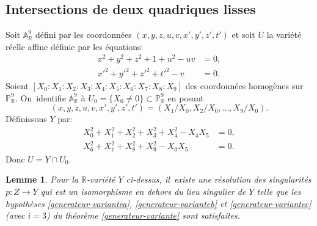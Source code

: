 \documentclass[JEP,XML,SOM,Unicode,francais,published]{cedram}
\newtheorem{lemma}[thm]{Lemme}
\theoremstyle{definition}
\newcommand{\R}{\mathbb R}
\newcommand{\A}{\mathbb A}
\renewcommand{\P}{\mathbb P}
\begin{document}
\subsection{Intersections de deux quadriques lisses}

Soit $\A^9_\R$ défini par les coordonnées $(x, y, z, u, v, x', y', z', t')$ et soit $U$ la variété réelle affine définie par les équations:
\begin{align}
x^2+y^2+z^2+1+u^2 - uv &= 0, \label{eq:U1} \\
x'^2+y'^2+z'^2+t'^2 - v &= 0. \label{eq:U2}
\end{align}
Soient $[X_0: X_1: X_2: X_3: X_4: X_5: X_6: X_7: X_8: X_9]$ des coordonnées homogènes sur $\P^9_\R$. On~identifie $\A^9_\R$ à $U_0=\{X_0\neq 0\}\subset \P^9_\R$ en posant
\[(x,y,z,u,v,x',y',z',t')=(X_1/X_0,X_2/X_0,\dots, X_9/X_0).\]
Définissons $Y$ par:
\begin{align}
X_0^2+X_1^2+X_2^2+X_3^2+X_4^2 - X_4X_5 &= 0, \label{eq:F1} \\
X_6^2+X_7^2+X_8^2+X_9^2 -X_0X_5 &= 0. \label{eq:F2}
\end{align}
Donc $U=Y\cap U_0$.

\begin{lemma}\label{int-2-quadriques-a-c}
Pour la $\R$-variété $Y$ ci-dessus, il~existe une résolution des singularités $p\colon Z\to Y$ qui est un isomorphisme en dehors du lieu singulier de $Y$ telle que les hypothèses \eqref{generateur-variantea}, \eqref{generateur-varianteb} et \eqref{generateur-variantec} (avec $i=3$) du théorème \ref{generateur-variante} sont satisfaites.
\end{lemma}
\end{document}
